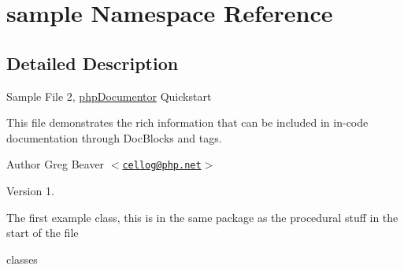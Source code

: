 \hypertarget{namespacesample}{\section{sample \-Namespace \-Reference}
\label{namespacesample}
}


\subsection{\-Detailed \-Description}
\-Sample \-File 2, \hyperlink{namespacephp_documentor}{php\-Documentor} \-Quickstart

\-This file demonstrates the rich information that can be included in in-\/code documentation through \-Doc\-Blocks and tags. \begin{DoxyAuthor}{\-Author}
\-Greg \-Beaver $<$\href{mailto:cellog@php.net}{\tt cellog@php.\-net}$>$ 
\end{DoxyAuthor}
\begin{DoxyVersion}{\-Version}
1.
\end{DoxyVersion}
\-The first example class, this is in the same package as the procedural stuff in the start of the file

classes 